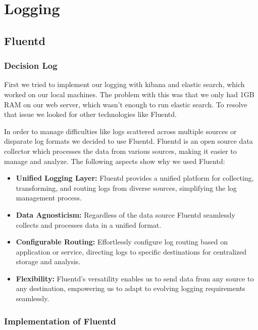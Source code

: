 \section{Logging}
\subsection{Fluentd}
\subsubsection{Decision Log}
First we tried to implement our logging with kibana and elastic search, which worked on our local machines. 
The problem with this was that we only had 1GB RAM on our web server,  which wasn't enough to run elastic search. 
To resolve that issue we looked for other technologies like Fluentd.

In order to manage difficulties like logs scattered across multiple sources or disparate log formats we decided to use Fluentd. 
Fluentd is an open source data collector which processes the data from various sources, making it easier to manage and analyze. 
The following aspects show why we used Fluentd: 
\begin{itemize}
    \item \textbf{Unified Logging Layer:} Fluentd provides a unified platform for collecting, transforming, and routing logs from diverse sources, simplifying the log management process.
    \item \textbf{Data Agnosticism:} Regardless of the data source Fluentd seamlessly collects and processes data in a unified format.
    \item \textbf{Configurable Routing:} Effortlessly configure log routing based on application or service, directing logs to specific destinations for centralized storage and analysis.
    \item \textbf{Flexibility:} Fluentd's versatility enables us to send data from any source to any destination, empowering us to adapt to evolving logging requirements seamlessly.
\end{itemize}

\subsubsection{Implementation of Fluentd}

